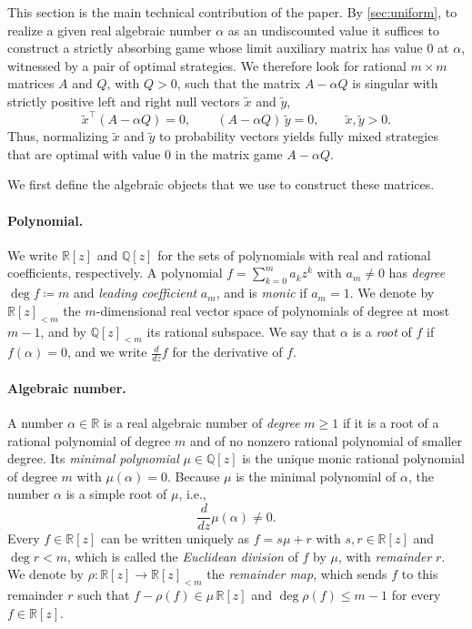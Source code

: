 \documentclass[11pt, a4paper]{article}
\theoremstyle{plain}
\theoremstyle{definition}
\newcommand{\Q}{\mathbb{Q}}
\newcommand{\R}{\mathbb{R}}
\newcommand{\PP}{\R[z]_{<m}}
\newcommand{\PQ}{\Q[z]_{<m}}
\newcommand{\defas}{\coloneqq}
\begin{document}
This section is the main technical contribution of the paper.
By \cref{sec:uniform}, to realize a given real algebraic number $\alpha$ as an undiscounted value it suffices to construct a strictly absorbing game whose limit auxiliary matrix has value $0$ at $\alpha$, witnessed by a pair of optimal strategies.
We therefore look for rational $m\times m$ matrices $A$ and $Q$, with $Q>0$, such that the matrix $A-\alpha Q$ is singular with strictly positive left and right null vectors $\tilde x$ and $\tilde y$,
\[
\tilde x^{\top}(A-\alpha Q)=0,
\qquad
(A-\alpha Q)\,\tilde y=0,
\qquad
\tilde x,\tilde y>0 .
\]
Thus, normalizing $\tilde x$ and $\tilde y$ to probability vectors yields fully mixed strategies that are optimal with value $0$ in the matrix game $A-\alpha Q$.

We first define the algebraic objects that we use to construct these matrices.

\paragraph{Polynomial.}
We write $\R[z]$ and $\Q[z]$ for the sets of polynomials with real and rational coefficients, respectively.
A polynomial $f=\sum_{k=0}^m a_kz^k$ with $a_m\neq0$ has \emph{degree} $\deg f\defas m$ and \emph{leading coefficient} $a_m$, and is \emph{monic} if $a_m=1$.
We denote by $\PP$ the $m$-dimensional real vector space of polynomials of degree at most $m-1$, and by $\PQ$ its rational subspace.
We say that $\alpha$ is a \emph{root} of $f$ if $f(\alpha)=0$, and we write $\frac{d}{dz}f$ for the derivative of $f$.

\paragraph{Algebraic number.}
A number $\alpha \in \R$ is a real algebraic number of \emph{degree} $m\geq1$ if it is a root of a rational polynomial of degree $m$ and of no nonzero rational polynomial of smaller degree.
Its \emph{minimal polynomial} $\mu \in \Q[z]$ is the unique monic rational polynomial of degree $m$ with $\mu(\alpha)=0$.
Because $\mu$ is the minimal polynomial of $\alpha$, the number $\alpha$ is a simple root of $\mu$, i.e.,
\begin{equation}\label{eq:simple}
\frac{d}{dz} \mu(\alpha)\neq0 .
\end{equation}
Every $f\in\R[z]$ can be written uniquely as $f=s\mu+r$ with $s,r\in\R[z]$ and $\deg r<m$, which is called the \emph{Euclidean division} of $f$ by $\mu$, with \emph{remainder} $r$.
We denote by $\rho\colon\R[z]\to\PP$ the \emph{remainder map}, which sends $f$ to this remainder $r$ such that $f-\rho(f)\in\mu\,\R[z]$ and $\deg\rho(f)\leq m-1$ for every $f\in\R[z]$.
\end{document}

